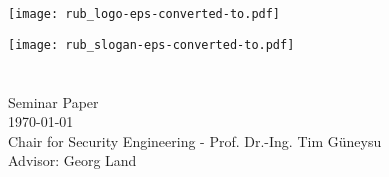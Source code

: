 
\frontmatter

\begin{titlepage}
    \enlargethispage{3cm}
    \vspace*{-32mm}\hspace*{120mm}
    \texttt{[image: rub\_logo-eps-converted-to.pdf]}
    
    \vspace*{11cm}\hspace*{0mm}
    \begin{minipage}[b]{1\linewidth}
        \sffamily
        \hspace{-17.2mm}\texttt{[image: rub\_slogan-eps-converted-to.pdf]}\\
        
        \nohyphens{
            {\bfseries \LARGE \sffamily {\thtitle}}
        }\\
        
        \large{
            \thauthor
        }\\
        
        \vspace*{35mm}
        \normalsize{
            Seminar Paper\\
            \today\\
            Chair for Security Engineering - Prof. Dr.-Ing. Tim G{\"u}neysu\\
            Advisor: Georg Land
        }
    \end{minipage}
\end{titlepage}

\newpage\thispagestyle{empty}
